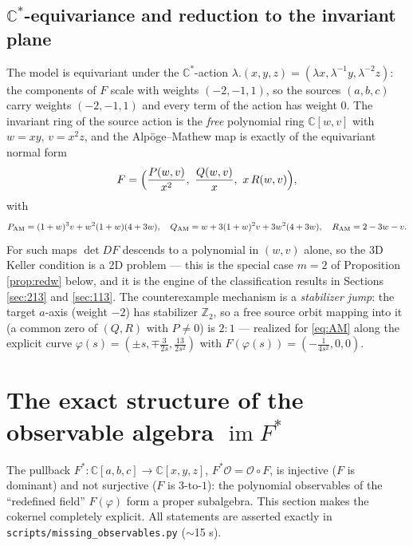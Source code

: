 \documentclass[11pt]{article}
\theoremstyle{definition}
\theoremstyle{remark}
\newcommand{\C}{\mathbb{C}}
\newcommand{\Z}{\mathbb{Z}}
\newcommand{\im}{\operatorname{im}}
\begin{document}
\subsection{\texorpdfstring{$\C^*$}{C*}-equivariance and reduction to
the invariant plane}
\label{sec:equivariance}

The model is equivariant under the $\C^*$-action
$\lambda.(x,y,z) = (\lambda x, \lambda^{-1}y, \lambda^{-2}z)$: the
components of $F$ scale with weights $(-2,-1,1)$, so the sources
$(a,b,c)$ carry weights $(-2,-1,1)$ and every term of the action has
weight $0$. The invariant ring of the source action is the \emph{free}
polynomial ring $\C[w,v]$ with $w=xy$, $v=x^2z$, and the
Alp\"oge--Mathew map is exactly of the equivariant normal form
\[
F = \Bigl(\frac{P(w,v)}{x^{2}},\ \frac{Q(w,v)}{x},\ x\,R(w,v)\Bigr),
\]
with
\[
P_{\rm AM} = (1+w)^3 v + w^2(1+w)(4+3w),\quad
Q_{\rm AM} = w + 3(1+w)^2 v + 3w^2(4+3w),\quad
R_{\rm AM} = 2 - 3w - v .
\]
For such maps $\det DF$ descends to a polynomial in $(w,v)$ alone, so
the 3D Keller condition is a 2D problem --- this is the special case
$m=2$ of Proposition \ref{prop:redw} below, and it is the engine of the
classification results in Sections \ref{sec:213} and \ref{sec:113}. The
counterexample mechanism is a \emph{stabilizer jump}: the target
$a$-axis (weight $-2$) has stabilizer $\Z_2$, so a free source orbit
mapping into it (a common zero of $(Q,R)$ with $P\ne0$) is $2{:}1$
--- realized for \eqref{eq:AM} along the explicit curve
$\varphi(s) = (\pm s, \mp\tfrac{3}{2s}, \tfrac{13}{2s^2})$ with
$F(\varphi(s)) = (-\tfrac{1}{4s^2},0,0)$.

\section{The exact structure of the observable algebra
\texorpdfstring{$\im F^*$}{im F*}}
\label{sec:obs}

The pullback $F^*:\C[a,b,c]\to\C[x,y,z]$, $F^*\mathcal{O} =
\mathcal{O}\circ F$, is injective ($F$ is dominant) and not surjective
($F$ is $3$-to-$1$): the polynomial observables of the ``redefined
field'' $F(\varphi)$ form a proper subalgebra. This section makes the
cokernel completely explicit. All statements are asserted exactly in
\texttt{scripts/missing\_observables.py} ($\sim$15 s).
\end{document}
